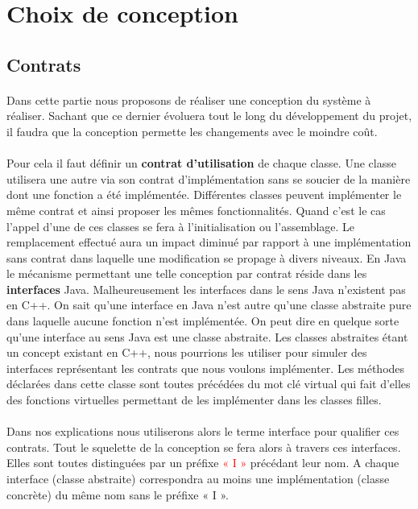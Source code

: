\documentclass[a4paper, 10pt]{report}
\begin{document}
\section{Choix de conception}
\subsection{Contrats}
\paragraph*{}
Dans cette partie nous proposons de réaliser une conception du système à réaliser. Sachant que ce dernier évoluera tout 
le long du développement du projet, il faudra que la conception permette les changements avec le moindre coût. 
\paragraph*{}
Pour cela il faut définir un \textbf{contrat d’utilisation} de chaque classe. Une classe utilisera une autre via son contrat 
d’implémentation sans se soucier de la manière dont une fonction a été implémentée. Différentes classes peuvent 
implémenter le même contrat et ainsi proposer les mêmes fonctionnalités. Quand c’est le cas l’appel d’une de ces classes 
se fera à l’initialisation ou l’assemblage. Le remplacement effectué aura un impact diminué par rapport à une implémentation 
sans contrat dans laquelle une modification se propage à divers niveaux. \newline
En Java le mécanisme permettant une telle conception par contrat réside dans les \textbf{interfaces} Java. Malheureusement 
les interfaces dans le sens Java n’existent pas en C++. On sait qu’une interface en Java n’est autre qu’une classe 
abstraite pure dans laquelle aucune fonction n’est implémentée. On peut dire en quelque sorte qu’une interface au sens 
Java est une classe abstraite. Les classes abstraites étant un concept existant en C++, nous pourrions les utiliser 
pour simuler des interfaces représentant les contrats que nous voulons implémenter. Les méthodes déclarées dans cette 
classe sont toutes précédées du mot clé virtual qui fait d’elles des fonctions virtuelles permettant de les implémenter 
dans les classes filles.
\paragraph*{}
Dans nos explications nous utiliserons alors le terme interface pour qualifier ces contrats. Tout le squelette de la 
conception se fera alors à travers ces interfaces. Elles sont toutes distinguées par un préfixe \textcolor{red}{« I »} précédant leur nom. 
A chaque interface (classe abstraite) correspondra au moins une implémentation (classe concrète) du même nom sans le 
préfixe « I ».
\end{document}
